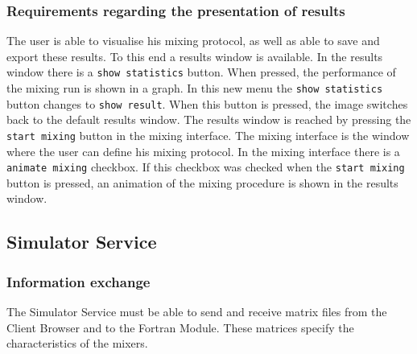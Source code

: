 
\subsubsection{Requirements regarding the presentation of results}
The user is able to visualise his mixing protocol, as well as able to save and export these results. To this end a results window is available. In the results window there is a \texttt{show statistics} button. When pressed, the performance of the mixing run is shown in a graph. In this new menu the \texttt{show statistics} button changes to \texttt{show result}. When this button is pressed, the image switches back to the default results window. The results window is reached by pressing the \texttt{start mixing} button in the mixing interface. The mixing interface is the window where the user can define his mixing protocol. In the mixing interface there is a \texttt{animate mixing} checkbox. If this checkbox was checked when the \texttt{start mixing} button is pressed, an animation of the mixing procedure is shown in the results window.



\subsection[SS]{Simulator Service}

\subsubsection{Information exchange}
The Simulator Service must be able to send and receive matrix files from the Client Browser and to the Fortran Module. These matrices specify the characteristics of the mixers. 

